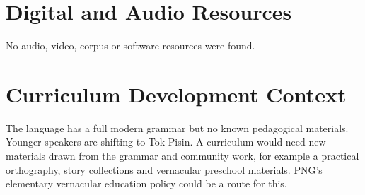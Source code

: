 \documentclass[12pt]{article}
\begin{document}
\section{Digital and Audio Resources}
No audio, video, corpus or software resources were found.

\section{Curriculum Development Context}
The language has a full modern grammar but no known pedagogical materials. Younger speakers are shifting to Tok Pisin. A curriculum would need new materials drawn from the grammar and community work, for example a practical orthography, story collections and vernacular preschool materials. PNG's elementary vernacular education policy could be a route for this.
\end{document}
